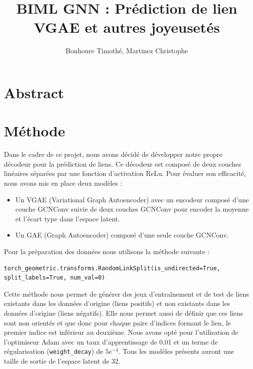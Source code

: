 \documentclass{article}
\begin{document}
\renewcommand{\arraystretch}{1.5}

\title{BIML GNN : Prédiction de lien \\
\footnotesize{VGAE et autres joyeusetés}}
\author{Bonhoure Timothé, Martinez Christophe}                      %

\maketitle
\tableofcontents
\section*{Abstract}
\newpage

\section{Méthode}

Dans le cadre de ce projet, nous avons décidé de développer notre propre décodeur pour la prédiction de liens. Ce décodeur est composé de deux couches linéaires séparées par une fonction d'activation ReLu. Pour évaluer son efficacité, nous avons mis en place deux modèles :
\begin{itemize}
    \item Un VGAE (Variational Graph Autoencoder) avec un encodeur composé d'une couche GCNConv suivie de deux couches GCNConv pour encoder la moyenne et l'écart type dans l'espace latent.
    \item Un GAE (Graph Autoencoder) composé d'une seule couche GCNConv.
\end{itemize}
Pour la préparation des données nous utilisons la méthode suivante :
\begin{verbatim}
torch_geometric.transforms.RandomLinkSplit(is_undirected=True, split_labels=True, num_val=0)
\end{verbatim}
Cette méthode nous permet de générer des jeux d’entraînement et de test de liens existants dans les données d'origine (liens positifs) et non existants dans les données d'origine (liens négatifs). Elle nous permet aussi de définir que ces liens sont non orientés et que donc pour chaque paire d’indices formant le lien, le premier indice est inférieur au deuxième.
Nous avons opté pour l'utilisation de l'optimiseur Adam avec un taux d'apprentissage de 0,01 et un terme de régularisation (\texttt{weight\_decay}) de \(5e^{-4}\).
Tous les modèles présents auront une taille de sortie de l'espace latent de 32.
\end{document}
